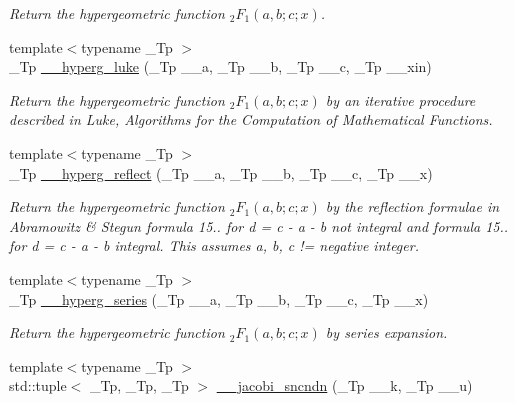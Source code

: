 \begin{DoxyCompactItemize}
\begin{DoxyCompactList}\small\item\em Return the hypergeometric function $ _2F_1(a,b;c;x) $. \end{DoxyCompactList}\item 
{\footnotesize template$<$typename \+\_\+\+Tp $>$ }\\\+\_\+\+Tp \hyperlink{namespacestd_1_1____detail_a0c1ec62b5c39c93ad70a8229a7a6d84d}{\+\_\+\+\_\+hyperg\+\_\+luke} (\+\_\+\+Tp \+\_\+\+\_\+a, \+\_\+\+Tp \+\_\+\+\_\+b, \+\_\+\+Tp \+\_\+\+\_\+c, \+\_\+\+Tp \+\_\+\+\_\+xin)
\begin{DoxyCompactList}\small\item\em Return the hypergeometric function $ _2F_1(a,b;c;x) $ by an iterative procedure described in Luke, Algorithms for the Computation of Mathematical Functions. \end{DoxyCompactList}\item 
{\footnotesize template$<$typename \+\_\+\+Tp $>$ }\\\+\_\+\+Tp \hyperlink{namespacestd_1_1____detail_a3c3baddc93bfaf1cb368d4b74e53542d}{\+\_\+\+\_\+hyperg\+\_\+reflect} (\+\_\+\+Tp \+\_\+\+\_\+a, \+\_\+\+Tp \+\_\+\+\_\+b, \+\_\+\+Tp \+\_\+\+\_\+c, \+\_\+\+Tp \+\_\+\+\_\+x)
\begin{DoxyCompactList}\small\item\em Return the hypergeometric function $ _2F_1(a,b;c;x) $ by the reflection formulae in Abramowitz \& Stegun formula 15.. for d = c -\/ a -\/ b not integral and formula 15.. for d = c -\/ a -\/ b integral. This assumes a, b, c != negative integer. \end{DoxyCompactList}\item 
{\footnotesize template$<$typename \+\_\+\+Tp $>$ }\\\+\_\+\+Tp \hyperlink{namespacestd_1_1____detail_ad234e0d31f55cd3748169dccb2533c6a}{\+\_\+\+\_\+hyperg\+\_\+series} (\+\_\+\+Tp \+\_\+\+\_\+a, \+\_\+\+Tp \+\_\+\+\_\+b, \+\_\+\+Tp \+\_\+\+\_\+c, \+\_\+\+Tp \+\_\+\+\_\+x)
\begin{DoxyCompactList}\small\item\em Return the hypergeometric function $ _2F_1(a,b;c;x) $ by series expansion. \end{DoxyCompactList}\item 
{\footnotesize template$<$typename \+\_\+\+Tp $>$ }\\std\+::tuple$<$ \+\_\+\+Tp, \+\_\+\+Tp, \+\_\+\+Tp $>$ \hyperlink{namespacestd_1_1____detail_a98915d9bbc58112db7ffef2753313a63}{\+\_\+\+\_\+jacobi\+\_\+sncndn} (\+\_\+\+Tp \+\_\+\+\_\+k, \+\_\+\+Tp \+\_\+\+\_\+u)

\end{DoxyCompactItemize}
